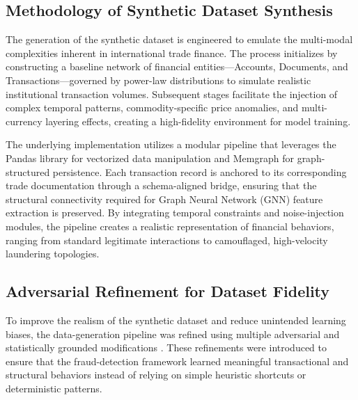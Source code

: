 \subsection[Synthetic Dataset Synthesis]{\textbf{Methodology of Synthetic Dataset Synthesis}}

The generation of the synthetic dataset is engineered to emulate the multi-modal complexities inherent in international trade finance. The process initializes by constructing a baseline network of financial entities—Accounts, Documents, and Transactions—governed by power-law distributions to simulate realistic institutional transaction volumes. Subsequent stages facilitate the injection of complex temporal patterns, commodity-specific price anomalies, and multi-currency layering effects, creating a high-fidelity environment for model training.

The underlying implementation utilizes a modular pipeline that leverages the Pandas library for vectorized data manipulation and Memgraph for graph-structured persistence. Each transaction record is anchored to its corresponding trade documentation through a schema-aligned bridge, ensuring that the structural connectivity required for Graph Neural Network (GNN) feature extraction is preserved. By integrating temporal constraints and noise-injection modules, the pipeline creates a realistic representation of financial behaviors, ranging from standard legitimate interactions to camouflaged, high-velocity laundering topologies.

\subsection[Adversarial Refinement for Dataset Fidelity]{\textbf{Adversarial Refinement for Dataset Fidelity}}

To improve the realism of the synthetic dataset and reduce unintended learning biases, the data-generation pipeline was refined using multiple adversarial and statistically grounded modifications \cite{synthetic-tbml-framework}. These refinements were introduced to ensure that the fraud-detection framework learned meaningful transactional and structural behaviors instead of relying on simple heuristic shortcuts or deterministic patterns.

